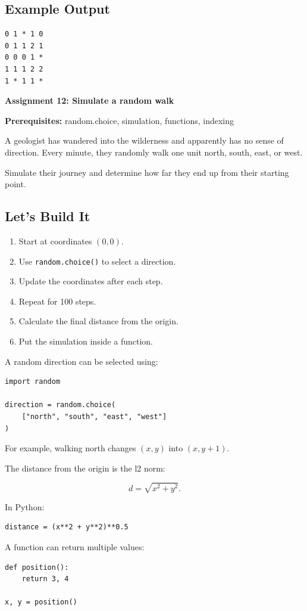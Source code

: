 \documentclass[11pt,letterpaper]{article}
\newcommand{\assignment}[3]{
    \clearpage
    {\Large\bfseries\color{navy} Assignment #1: #2}

    \vspace{2mm}
    {\small\color{darkgray}\textbf{Prerequisites:} #3}

    \vspace{3mm}
}
\newcommand{\steps}{\subsection*{Let's Build It}}
\newcommand{\exampleoutput}{\subsection*{Example Output}}
\begin{document}
\exampleoutput

\begin{lstlisting}[style=outputstyle]
0 1 * 1 0
0 1 1 2 1
0 0 0 1 *
1 1 1 2 2
1 * 1 1 *
\end{lstlisting}

\assignment{12}{Simulate a random walk}
{random.choice, simulation, functions, indexing}

\begin{missionbox}
A geologist has wandered into the wilderness and apparently has no sense of direction. Every minute, they randomly walk one unit north, south, east, or west.

Simulate their journey and determine how far they end up from their starting point.
\end{missionbox}

\steps

\begin{enumerate}
    \item Start at coordinates $(0,0)$.
    \item Use \texttt{random.choice()} to select a direction.
    \item Update the coordinates after each step.
    \item Repeat for 100 steps.
    \item Calculate the final distance from the origin.
    \item Put the simulation inside a function.
\end{enumerate}

\begin{hintbox}
A random direction can be selected using:

\begin{lstlisting}
import random

direction = random.choice(
    ["north", "south", "east", "west"]
)
\end{lstlisting}

For example, walking north changes
$(x,y)$ into $(x,y+1)$.

The distance from the origin is the l2 norm:

\[
d=\sqrt{x^2+y^2}.
\]

In Python:

\begin{lstlisting}
distance = (x**2 + y**2)**0.5
\end{lstlisting}

A function can return multiple values:

\begin{lstlisting}
def position():
    return 3, 4

x, y = position()
\end{lstlisting}
\end{hintbox}
\end{document}
